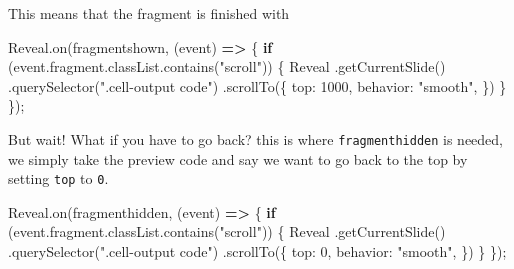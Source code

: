 \documentclass[
  letterpaper,
  DIV=11,
  numbers=noendperiod]{scrreprt}
\newenvironment{Shaded}{\begin{snugshade}}{\end{snugshade}}
\newcommand{\AttributeTok}[1]{\textcolor[rgb]{0.40,0.45,0.13}{#1}}
\newcommand{\BuiltInTok}[1]{\textcolor[rgb]{0.00,0.23,0.31}{#1}}
\newcommand{\ControlFlowTok}[1]{\textcolor[rgb]{0.00,0.23,0.31}{\textbf{#1}}}
\newcommand{\DataTypeTok}[1]{\textcolor[rgb]{0.68,0.00,0.00}{#1}}
\newcommand{\DecValTok}[1]{\textcolor[rgb]{0.68,0.00,0.00}{#1}}
\newcommand{\FunctionTok}[1]{\textcolor[rgb]{0.28,0.35,0.67}{#1}}
\newcommand{\KeywordTok}[1]{\textcolor[rgb]{0.00,0.23,0.31}{\textbf{#1}}}
\newcommand{\NormalTok}[1]{\textcolor[rgb]{0.00,0.23,0.31}{#1}}
\newcommand{\OperatorTok}[1]{\textcolor[rgb]{0.37,0.37,0.37}{#1}}
\newcommand{\StringTok}[1]{\textcolor[rgb]{0.13,0.47,0.30}{#1}}
\begin{document}
This means that the fragment is finished with

\begin{Shaded}
\begin{Highlighting}[]
\NormalTok{Reveal}\OperatorTok{.}\FunctionTok{on}\NormalTok{(}\StringTok{\textquotesingle{}fragmentshown\textquotesingle{}}\OperatorTok{,}\NormalTok{ (}\BuiltInTok{event}\NormalTok{) }\KeywordTok{=\textgreater{}}\NormalTok{ \{}
  \ControlFlowTok{if}\NormalTok{ (}\BuiltInTok{event}\OperatorTok{.}\AttributeTok{fragment}\OperatorTok{.}\AttributeTok{classList}\OperatorTok{.}\FunctionTok{contains}\NormalTok{(}\StringTok{"scroll"}\NormalTok{)) \{}
\NormalTok{ Reveal}
    \OperatorTok{.}\FunctionTok{getCurrentSlide}\NormalTok{()}
    \OperatorTok{.}\FunctionTok{querySelector}\NormalTok{(}\StringTok{".cell{-}output code"}\NormalTok{)}
    \OperatorTok{.}\FunctionTok{scrollTo}\NormalTok{(\{}
 \DataTypeTok{top}\OperatorTok{:} \DecValTok{1000}\OperatorTok{,}
 \DataTypeTok{behavior}\OperatorTok{:} \StringTok{"smooth"}\OperatorTok{,}
\NormalTok{    \})}
\NormalTok{  \}}
\NormalTok{\})}\OperatorTok{;}
\end{Highlighting}
\end{Shaded}

But wait! What if you have to go back? this is where
\texttt{fragmenthidden} is needed, we simply take the preview code and
say we want to go back to the top by setting \texttt{top} to \texttt{0}.

\begin{Shaded}
\begin{Highlighting}[]
\NormalTok{Reveal}\OperatorTok{.}\FunctionTok{on}\NormalTok{(}\StringTok{\textquotesingle{}fragmenthidden\textquotesingle{}}\OperatorTok{,}\NormalTok{ (}\BuiltInTok{event}\NormalTok{) }\KeywordTok{=\textgreater{}}\NormalTok{ \{}
  \ControlFlowTok{if}\NormalTok{ (}\BuiltInTok{event}\OperatorTok{.}\AttributeTok{fragment}\OperatorTok{.}\AttributeTok{classList}\OperatorTok{.}\FunctionTok{contains}\NormalTok{(}\StringTok{"scroll"}\NormalTok{)) \{}
\NormalTok{ Reveal}
    \OperatorTok{.}\FunctionTok{getCurrentSlide}\NormalTok{()}
    \OperatorTok{.}\FunctionTok{querySelector}\NormalTok{(}\StringTok{".cell{-}output code"}\NormalTok{)}
    \OperatorTok{.}\FunctionTok{scrollTo}\NormalTok{(\{}
 \DataTypeTok{top}\OperatorTok{:} \DecValTok{0}\OperatorTok{,}
 \DataTypeTok{behavior}\OperatorTok{:} \StringTok{"smooth"}\OperatorTok{,}
\NormalTok{    \})}
\NormalTok{  \}}
\NormalTok{\})}\OperatorTok{;}
\end{Highlighting}
\end{Shaded}
\end{document}
